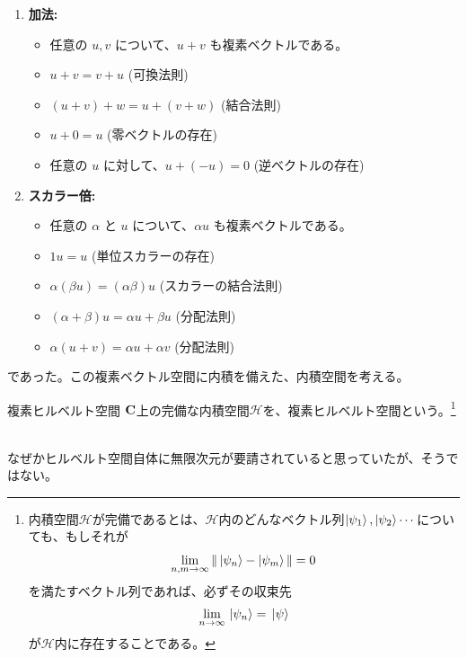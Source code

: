 \documentclass[a4paper,11pt]{jsarticle}
\begin{document}
\begin{enumerate}
    \item \textbf{加法:}
    \begin{itemize}
        \item 任意の \( u, v \) について、\( u + v \) も複素ベクトルである。
        \item \( u + v = v + u \) (可換法則)
        \item \( (u + v) + w = u + (v + w) \) (結合法則)
        \item \( u + 0 = u \) (零ベクトルの存在)
        \item 任意の \( u \) に対して、\( u + (-u) = 0 \) (逆ベクトルの存在)
    \end{itemize}
    
    \item \textbf{スカラー倍:}
    \begin{itemize}
        \item 任意の \( \alpha \) と \( u \) について、\( \alpha u \) も複素ベクトルである。
        \item \( 1u = u \) (単位スカラーの存在)
        \item \( \alpha(\beta u) = (\alpha \beta) u \) (スカラーの結合法則)
        \item \( (\alpha + \beta)u = \alpha u + \beta u \) (分配法則)
        \item \( \alpha(u + v) = \alpha u + \alpha v \) (分配法則)
    \end{itemize}
\end{enumerate}
であった。この複素ベクトル空間に内積を備えた、内積空間を考える。
\begin{itembox}[l]{複素ヒルベルト空間}
\textbf{$\vb C$}上の完備な内積空間$\mathcal{H}$を、複素ヒルベルト空間という。\footnote
{
内積空間$\mathcal{H}$が完備であるとは、$\mathcal{H}$内のどんなベクトル列$\ket{\psi_1},\ket{\psi_2}\cdots$についても、もしそれが
\begin{align}
\lim_{n,m \to \infty} \|\ket{\psi_n}-\ket{\psi_m}\|=0
\end{align}
を満たすベクトル列であれば、必ずその収束先
\begin{align}
\lim_{n\to \infty} \ket*{\psi_n}=\ket*{\psi}
\end{align}
が$\mathcal H$内に存在することである。
}
\end{itembox}

\\
なぜかヒルベルト空間自体に無限次元が要請されていると思っていたが、そうではない。\\
\end{document}
